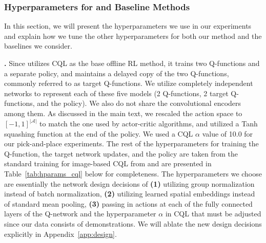 \documentclass[conference]{IEEEtran}
\begin{document}
\begin{table}[h]
\centering
{}
\vspace{0.1cm}
\caption{\footnotesize{\textbf{Performance of advantage-weighted BC} on two tasks from Table~\ref{tab:scenario4}. Observe that weighting the BC objective using advantage-weights computed using the Q-function learned by \methodname leads to much better performance than standard BC (finetune), and close to PTR. This test indicates that the Q-function in \methodname allows us to focus on more critical points, thereby preventing the failures discussed in Figure~\ref{fig:dumb_behavior2}.}}
\label{tab:aw_bc}
\end{table}


\subsubsection{Hyperparameters for \methodname and Baseline Methods}
\label{app:hyperparams}

In this section, we will present the hyperparameters we use in our experiments and explain how we tune the other hyperparameters for both our method \methodname and the baselines we consider.  

\textbf{\methodname.} Since \methodname utilizes CQL as the base offline RL method, it trains two Q-functions and a separate policy, and maintains a delayed copy of the two Q-functions, commonly referred to as target Q-functions. We utilize completely independent networks to represent each of these five models (2 Q-functions, 2 target Q-functions, and the policy). We also do not share the convolutional encoders among them. As discussed in the main text, we rescaled the action space to $[-1, 1]^{|\mathcal{A}|}$ to match the one used by actor-critic algorithms, and utilized a Tanh squashing function at the end of the policy. We used a CQL $\alpha$ value of 10.0 for our pick-and-place experiments. The rest of the hyperparameters for training the Q-function, the target network updates, and the policy are taken from the standard training for image-based CQL from \citet{singh2020cog} and are presented in Table~\ref{tab:hparams_cql} below for completeness. The hyperparameters we choose are essentially the network design decisions of \textbf{(1)} utilizing group normalization instead of batch normalization, \textbf{(2)} utilizing learned spatial embeddings instead of standard mean pooling, \textbf{(3)} passing in actions at each of the fully connected layers of the Q-network and the hyperparameter $\alpha$ in CQL that must be adjusted since our data consists of demonstrations. We will ablate the new design decisions explicitly in Appendix~\ref{app:design}.
\end{document}
